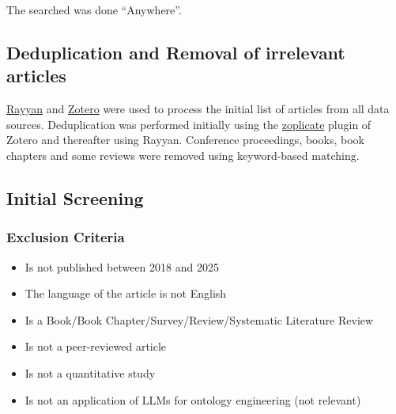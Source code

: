 \documentclass[a4paper,colorinlistoftodos]{article}
\begin{document}
The searched was done ``Anywhere''.




\subsection{Deduplication and Removal of irrelevant articles}
\label{subsec:deduplication}

\href{https://rayyan.ai}{Rayyan} and \href{https://www.zotero.org}{Zotero}
were used to process the initial list of articles from all data
sources. Deduplication was performed initially using the
\href{https://chenglongma.com/zoplicate/}{zoplicate} plugin of Zotero and
thereafter using Rayyan. Conference proceedings, books, book chapters and some
reviews were removed using keyword-based matching.

\subsection{Initial Screening}
\label{subsec:initial-screening}

\subsubsection{Exclusion Criteria}
\label{subsubsec:exclusion-criteria}

\begin{itemize}
  \item Is not published between 2018 and 2025
  \item The language of the article is not English
  \item Is a Book/Book Chapter/Survey/Review/Systematic Literature Review
  \item Is not a peer-reviewed article
  \item Is not a quantitative study
  \item Is not an application of LLMs for ontology engineering (not relevant)
\end{itemize}
\end{document}

